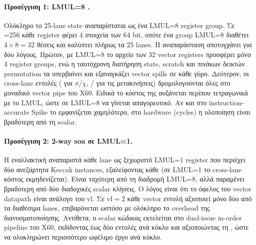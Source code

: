 \paragraph{Προσέγγιση 1: LMUL=8 .}
Ολόκληρο το \num{25}-lane state αναπαρίσταται ως ένα LMUL=8 register group. Σε
\VLEN{}=\num{256} κάθε register φέρει \num{4} στοιχεία των \num{64} bit, οπότε
ένα group LMUL=8 διαθέτει $4\times8=32$ θέσεις και καλύπτει πλήρως τα \num{25}
lanes. Η αναπαράσταση αποτυγχάνει για δύο λόγους. Πρώτον, με LMUL=8 το αρχείο
των \num{32} vector registers προσφέρει μόνο \num{4} register groups, ενώ η
ταυτόχρονη διατήρηση state, scratch και πινάκων δεικτών permutation τα
υπερβαίνει και εξαναγκάζει vector spills σε κάθε γύρο. Δεύτερον, οι cross-lane
εντολές ( για $\pi$/$\chi$, /
για τις μετακινήσεις) δρομολογούνται όλες στο μοναδικό vector pipe του X60.
Ειδικά το κόστος της  αυξάνεται περίπου τετραγωνικά με το
LMUL, ώστε σε LMUL=8 να γίνεται απαγορευτικό. Αν και στο instruction-accurate Spike το
\instret εμφανίζεται χαμηλότερο, στο hardware (cycles) η υλοποίηση είναι βραδύτερη από τη scalar.

\paragraph{Προσέγγιση 2: 2-way \gls{soa} σε LMUL=1.}
Η εναλλακτική αναπαριστά κάθε lane ως ξεχωριστό LMUL=1 register που περιέχει
δύο ανεξάρτητα Keccak instances, εξαλείφοντας κάθε  (σε LMUL=1
το cross-lane κόστος εκμηδενίζεται). Είναι ταχύτερη από τη διαδρομή LMUL=8, αλλά
παραμένει βραδύτερη από δύο διαδοχικές scalar κλήσεις. Ο λόγος είναι ότι το
όφελος του vector datapath είναι ανάλογο του vl. Σε $\text{vl}=2$ κάθε vector
εντολή αξιοποιεί μόνο δύο από τα διαθέσιμα lanes, επιβαρύνεται ωστόσο με ολόκληρο
το overhead της διανυσματοποίησης.
Αντίθετα, ο scalar κώδικας εκτελείται στο dual-issue in-order pipeline του X60,
εκδίδοντας έως δύο εντολές ανά κύκλο και αξιοποιώντας τη , ώστε
να ολοκληρώνει περισσότερο ωφέλιμο έργο ανά κύκλο.

